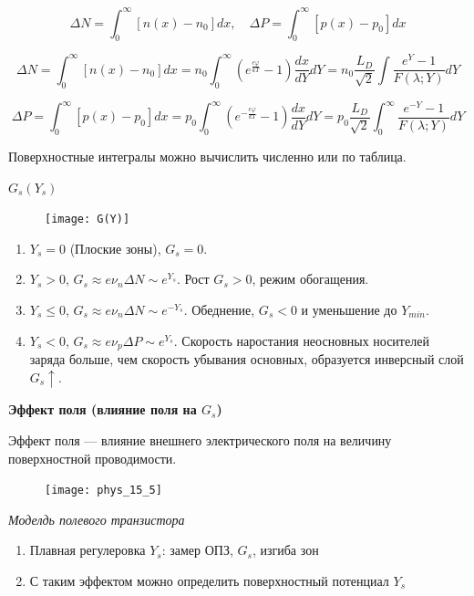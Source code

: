 $$
\Delta N=\int_0^{\infty}\left[n(x)-n_0\right] d x, \quad \Delta P=\int_0^{\infty}\left[p(x)-p_0\right] d x
$$

$$
\Delta N=\int_0^{\infty}\left[n(x)-n_0\right] d x=n_0 \int_0^{\infty}\left(e^{\frac{e \varphi}{k T}}-1\right) \frac{d x}{d Y} d Y= n_0 \frac{L _D}{\sqrt{2}} \int \frac{e^Y-1}{F(\lambda ; Y)} d Y
$$

$$
\Delta P=\int_0^{\infty}\left[p(x)-p_0\right] d x=p_0 \int_0^{\infty}\left(e^{-\frac{e \varphi}{k T}}-1\right) \frac{d x}{d Y} d Y =p_0 \frac{L _D}{\sqrt{2}} \int_0^{\infty} \frac{e^{-Y}-1}{F(\lambda ; Y)} d Y
$$

Поверхностные интегралы можно вычислить численно или по таблица.


\textbf{$G_s (Y_s)$}

\begin{figure}[h!]
    \centering
    \texttt{[image: G(Y)]}
\end{figure}

\begin{enumerate}
    \item $Y_s=0$ (Плоские зоны), $G_s=0$.
    \item $Y_s>0$, $G_s \approx e \nu_n \Delta N \sim e^{Y_s}$. Рост $G_s>0$, режим обогащения.
    \item $Y_s \leq 0$, $G_s \approx e \nu_n \Delta N \sim e^{-Y_s}$. Обеднение, $G_s<0$ и уменьшение до $Y_{min}$.
    \item $Y_s < 0$, $G_s \approx e \nu_p \Delta P \sim e^{Y_s}$. Скорость наростания неосновных носителей заряда больше, чем скорость убывания основных, образуется инверсный слой $G_s \uparrow$.
\end{enumerate}



\textbf{Эффект поля (влияние поля на $G_s$)}

Эффект поля --- влияние внешнего электрического поля на величину поверхностной
проводимости.

\begin{figure}[h!]
    \centering
    \texttt{[image: phys\_15\_5]}
\end{figure}


\textit{Моделдь полевого транзистора}

\begin{enumerate}
    \item Плавная регулеровка $Y_s$: замер ОПЗ, $G_s$, изгиба зон
    \item С таким эффектом можно определить поверхностный потенциал $Y_s$
\end{enumerate}

